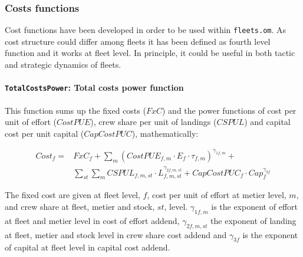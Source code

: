 	
\subsubsection{Costs functions}

	Cost functions have been developed in order to be used within \texttt{fleets.om}. As cost structure could 
	differ among fleets it has been defined as fourth level function and it works at fleet level. 
	In principle, it could be useful in both tactic and strategic dynamics of fleets. 
	 
	\paragraph{\texttt{TotalCostsPower}: Total costs power function} \hspace{0pt} \smallskip

	This function sums up the fixed costs ($FxC$) and the power functions of cost per unit of effort ($CostPUE$),
	crew share per unit of landings ($CSPUL$) and capital cost per unit capital ($CapCostPUC$), mathematically:
	
	\begin{align}
		Cost_f  = & FxC_f + \sum_{m} (CostPUE_{f,m} \cdot E_f \cdot \tau_{f,m})^{\gamma_{1 f,m}} + 
		 \nonumber \\
			 & \sum_{st} \sum_{m} CSPUL_{f,m,st} \cdot L_{f,m,st}^{\gamma_{2 f,m,st}} +  CapCostPUC_f\cdot Cap_f^{\gamma_{3 f}}
	\end{align}
	
	The fixed cost are given at fleet level, $f$, cost per unit of effort at metier level, $m$, and crew share at 
	fleet, metier and stock, $st$, level. $\gamma_{1 f,m}$ is the exponent of effort  at fleet and metier level 
	in cost of effort addend, $\gamma_{2 f,m,st}$ the exponent of landing at fleet, metier and stock level in crew share  
	cost addend and $\gamma_{3 f}$ is the exponent of capital at fleet level in capital cost addend.  



